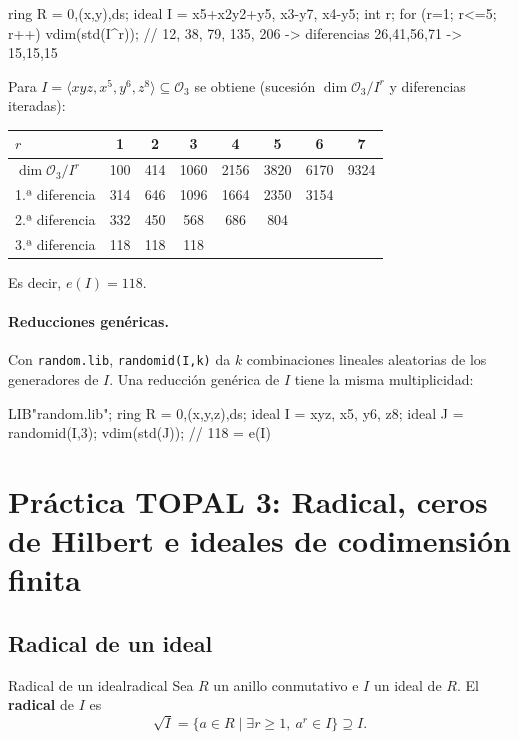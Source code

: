 \documentclass[11pt,a4paper]{article}
\begin{document}
\begin{singular}
ring R = 0,(x,y),ds;
ideal I = x5+x2y2+y5, x3-y7, x4-y5;
int r;
for (r=1; r<=5; r++) { vdim(std(I^r)); }
// 12, 38, 79, 135, 206 -> diferencias 26,41,56,71 -> 15,15,15
\end{singular}

Para $I = \langle xyz, x^5, y^6, z^8 \rangle \subseteq \mathcal{O}_3$ se obtiene (sucesión $\dim \mathcal{O}_3/I^r$ y diferencias iteradas):
\begin{center}
\begin{tabular}{l|ccccccc}
$r$ & 1 & 2 & 3 & 4 & 5 & 6 & 7 \\ \hline
$\dim \mathcal{O}_3/I^r$ & 100 & 414 & 1060 & 2156 & 3820 & 6170 & 9324 \\
1.ª diferencia & 314 & 646 & 1096 & 1664 & 2350 & 3154 & \\
2.ª diferencia & 332 & 450 & 568 & 686 & 804 & & \\
3.ª diferencia & 118 & 118 & 118 & & & &
\end{tabular}
\end{center}
Es decir, $e(I) = 118$.

\paragraph{Reducciones genéricas.} Con \texttt{random.lib}, \texttt{randomid(I,k)} da $k$ combinaciones lineales aleatorias de los generadores de $I$. Una reducción genérica de $I$ tiene la misma multiplicidad:

\begin{singular}
LIB"random.lib";
ring R = 0,(x,y,z),ds;
ideal I = xyz, x5, y6, z8;
ideal J = randomid(I,3);
vdim(std(J));               // 118 = e(I)
\end{singular}

\section{Práctica TOPAL 3: Radical, ceros de Hilbert e ideales de codimensión finita}
\label{sec:p3}

\subsection*{Radical de un ideal}

\begin{definicion}{Radical de un ideal}{radical}
Sea $R$ un anillo conmutativo e $I$ un ideal de $R$. El \textbf{radical} de $I$ es
$$ \sqrt{I} = \{ a \in R \mid \exists r \ge 1,\ a^r \in I \} \supseteq I. $$
\end{definicion}
\end{document}
